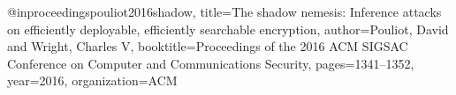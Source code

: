 @inproceedings{pouliot2016shadow,
  title={The shadow nemesis: Inference attacks on efficiently deployable, efficiently searchable encryption},
  author={Pouliot, David and Wright, Charles V},
  booktitle={Proceedings of the 2016 ACM SIGSAC Conference on Computer and Communications Security},
  pages={1341--1352},
  year={2016},
  organization={ACM}
}